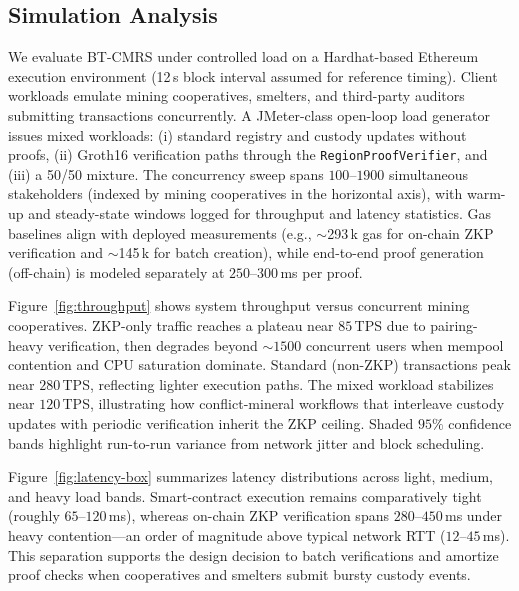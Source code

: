 
\subsection{Simulation Analysis}
\label{sec:simulation}

We evaluate BT-CMRS under controlled load on a Hardhat-based Ethereum execution environment (12\,s block interval assumed for reference timing). Client workloads emulate mining cooperatives, smelters, and third-party auditors submitting transactions concurrently. A JMeter-class open-loop load generator issues mixed workloads: (i) standard registry and custody updates without proofs, (ii) Groth16 verification paths through the \texttt{RegionProofVerifier}, and (iii) a 50/50 mixture. The concurrency sweep spans $100$--$1900$ simultaneous stakeholders (indexed by mining cooperatives in the horizontal axis), with warm-up and steady-state windows logged for throughput and latency statistics. Gas baselines align with deployed measurements (e.g., $\sim$293\,k gas for on-chain ZKP verification and $\sim$145\,k for batch creation), while end-to-end proof generation (off-chain) is modeled separately at $250$--$300$\,ms per proof.

Figure~\ref{fig:throughput} shows system throughput versus concurrent mining cooperatives. ZKP-only traffic reaches a plateau near $85$\,TPS due to pairing-heavy verification, then degrades beyond $\sim 1500$ concurrent users when mempool contention and CPU saturation dominate. Standard (non-ZKP) transactions peak near $280$\,TPS, reflecting lighter execution paths. The mixed workload stabilizes near $120$\,TPS, illustrating how conflict-mineral workflows that interleave custody updates with periodic verification inherit the ZKP ceiling. Shaded $95\%$ confidence bands highlight run-to-run variance from network jitter and block scheduling.

Figure~\ref{fig:latency-box} summarizes latency distributions across light, medium, and heavy load bands. Smart-contract execution remains comparatively tight (roughly $65$--$120$\,ms), whereas on-chain ZKP verification spans $280$--$450$\,ms under heavy contention—an order of magnitude above typical network RTT ($12$--$45$\,ms). This separation supports the design decision to batch verifications and amortize proof checks when cooperatives and smelters submit bursty custody events.

